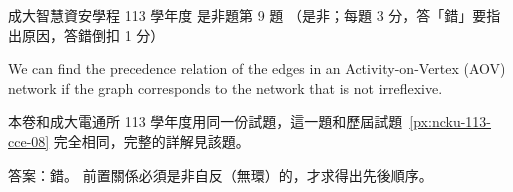 \begin{pastexam}[label={px:ncku-113-isec-08}]{成大智慧資安學程 113 學年度 是非題第 9 題}
（是非；每題 3 分，答「錯」要指出原因，答錯倒扣 1 分）

We can find the precedence relation of the edges in an Activity-on-Vertex (AOV) network if the
graph corresponds to the network that is not irreflexive.
\end{pastexam}

\begin{pastsoln}
本卷和成大電通所 113 學年度用同一份試題，這一題和歷屆試題~\ref{px:ncku-113-cce-08} 完全相同，完整的詳解見該題。

答案：錯。 前置關係必須是非自反（無環）的，才求得出先後順序。
\end{pastsoln}

